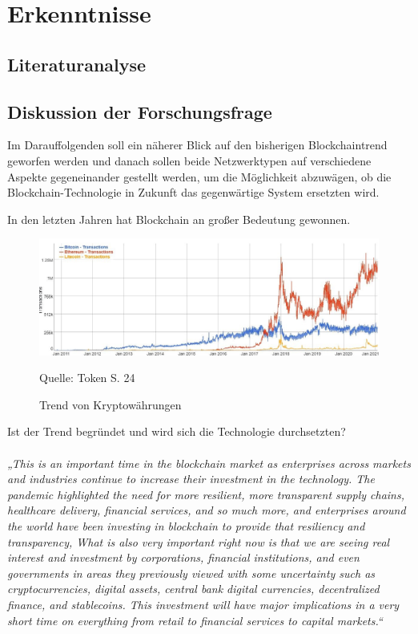 \newpage
\section{Erkenntnisse}

\subsection{Literaturanalyse}
\subsection{Diskussion der Forschungsfrage}
Im Darauffolgenden soll ein näherer Blick auf den bisherigen Blockchaintrend geworfen werden und danach sollen beide Netzwerktypen auf verschiedene Aspekte gegeneinander gestellt werden, um die Möglichkeit abzuwägen, ob die Blockchain-Technologie in Zukunft das gegenwärtige System ersetzten wird.

In den letzten Jahren hat Blockchain an großer Bedeutung gewonnen.

\begin{figure}[!ht]
    \caption{Trend von Kryptowährungen}
    \includegraphics[scale=0.4]{assets/figures/blockchain_trend.jpg}
    \begin{flushleft}
        Quelle: Token S. 24
    \end{flushleft}
    \label{fig:birds8}
\end{figure}




Ist der Trend begründet und wird sich die Technologie durchsetzten?
\paragraph*{\mbox{}}
\textit{„This is an important time in the blockchain market as enterprises across markets and industries continue to increase their investment in the technology. The pandemic highlighted the need for more resilient, more transparent supply chains, healthcare delivery, financial services, and so much more, and enterprises around the world have been investing in blockchain to provide that resiliency and transparency,
    What is also very important right now is that we are seeing real interest and investment by corporations, financial institutions, and even governments in areas they previously viewed with some uncertainty such as cryptocurrencies, digital assets, central bank digital currencies, decentralized finance, and stablecoins. This investment will have major implications in a very short time on everything from retail to financial services to capital markets.“} \cite{Solutions}

